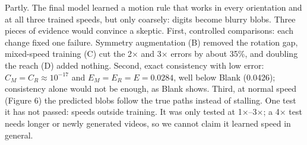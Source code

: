 Partly. The final model learned a motion rule that works in every orientation and at all three trained speeds, but only coarsely: digits become blurry blobs. Three pieces of evidence would convince a skeptic. First, controlled comparisons: each change fixed one failure. Symmetry augmentation (B) removed the rotation gap, mixed-speed training (C) cut the 2$\times$ and 3$\times$ errors by about 35\%, and doubling the reach (D) added nothing. Second, exact consistency with low error: $C_M=C_R\approx10^{-17}$ and $E_M=E_R=E=0.0284$, well below Blank (0.0426); consistency alone would not be enough, as Blank shows. Third, at normal speed (Figure 6) the predicted blobs follow the true paths instead of stalling. One test it has not passed: speeds outside training. It was only tested at 1$\times$--3$\times$; a 4$\times$ test needs longer or newly generated videos, so we cannot claim it learned speed in general.
